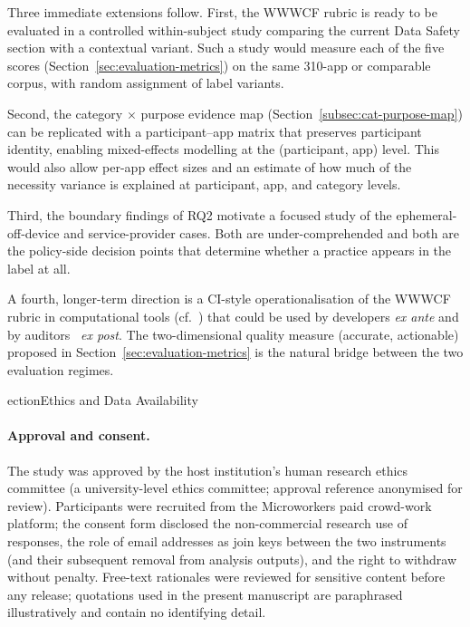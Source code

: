 \documentclass[11pt,a4paper]{article}
\begin{document}
Three immediate extensions follow. First, the WWWCF rubric is ready to
be evaluated in a controlled within-subject study comparing the current
Data Safety section with a contextual variant. Such a study would
measure each of the five scores (Section~\ref{sec:evaluation-metrics})
on the same 310-app or comparable corpus, with random assignment of
label variants.

Second, the category $\times$ purpose evidence map
(Section~\ref{subsec:cat-purpose-map}) can be replicated with a
participant--app matrix that preserves participant identity, enabling
mixed-effects modelling at the (participant, app) level. This would
also allow per-app effect sizes and an estimate of how much of the
necessity variance is explained at participant, app, and category
levels.

Third, the boundary findings of RQ2 motivate a focused study of the
ephemeral-off-device and service-provider cases. Both are
under-comprehended and both are the policy-side decision points that
determine whether a practice appears in the label at all.

A fourth, longer-term direction is a CI-style operationalisation of
the WWWCF rubric in computational tools (cf.~\citealt{barth:etal:2006,
shvartzshnaider:etal:2019}) that could be used by developers
\emph{ex ante} and by auditors~\citep{koch:etal:2022,andow:etal:2020}
\emph{ex post}. The two-dimensional quality measure (accurate,
actionable) proposed in Section~\ref{sec:evaluation-metrics} is the
natural bridge between the two evaluation regimes.

\subsVersion
ection{Ethics and Data Availability}
\label{sec:ethics}

\paragraph{Approval and consent.} The study was approved by the host
institution's human research ethics committee (a university-level
ethics committee; approval reference anonymised for review).
Participants were recruited from the Microworkers paid crowd-work
platform; the consent form disclosed the non-commercial research use
of responses, the role of email addresses as join keys between the
two instruments (and their subsequent removal from analysis outputs),
and the right to withdraw without penalty. Free-text rationales were
reviewed for sensitive content before any release; quotations used in
the present manuscript are paraphrased illustratively and contain no
identifying detail.
\end{document}
